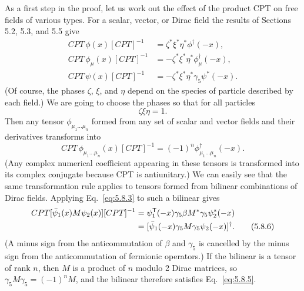 As a first step in the proof, let us work out the effect of the product CPT on
free fields of various types. For a scalar, vector, or Dirac field the results
of Sections 5.2, 5.3, and 5.5 give
\begin{align}
CPT\,\phi(x)[CPT]^{-1}&=\zeta^*\xi^*\eta^*\phi^\dagger(-x),
\tag{5.8.1}\label{eq:5.8.1}\\
CPT\,\phi_\mu(x)[CPT]^{-1}&=-\zeta^*\xi^*\eta^*\phi_\mu^\dagger(-x),
\tag{5.8.2}\label{eq:5.8.2}\\
CPT\,\psi(x)[CPT]^{-1}&=-\zeta^*\xi^*\eta^*\gamma_5\psi^*(-x).
\tag{5.8.3}\label{eq:5.8.3}
\end{align}
(Of course, the phases $\zeta$, $\xi$, and $\eta$ depend on the species of
particle described by each field.) We are going to choose the phases so that
for all particles
\begin{equation}
\zeta\xi\eta=1.
\tag{5.8.4}\label{eq:5.8.4}
\end{equation}
Then any tensor $\phi_{\mu_1\ldots\mu_n}$ formed from any set of scalar and
vector fields and their derivatives transforms into
\begin{equation}
CPT\,\phi_{\mu_1\ldots\mu_n}(x)[CPT]^{-1}
=(-1)^n\phi^\dagger_{\mu_1\ldots\mu_n}(-x).
\tag{5.8.5}\label{eq:5.8.5}
\end{equation}
(Any complex numerical coefficient appearing in these tensors is transformed
into its complex conjugate because CPT is antiunitary.) We can easily see that
the same transformation rule applies to tensors formed from bilinear
combinations of Dirac fields. Applying Eq.~\eqref{eq:5.8.3} to such a bilinear gives
\begin{align}
CPT[\bar\psi_1(x)M\psi_2(x)][CPT]^{-1}
&=\psi_1^{\mathsf T}(-x)\gamma_5\beta M^*\gamma_5\psi_2^*(-x)
\notag\\
&=[\bar\psi_1(-x)\gamma_5M\gamma_5\psi_2(-x)]^\dagger.
\tag{5.8.6}\label{eq:5.8.6}
\end{align}
(A minus sign from the anticommutation of $\beta$ and $\gamma_5$ is cancelled
by the minus sign from the anticommutation of fermionic operators.) If the
bilinear is a tensor of rank $n$, then $M$ is a product of $n$ modulo 2 Dirac
matrices, so $\gamma_5M\gamma_5=(-1)^nM$, and the bilinear therefore satisfies
Eq.~\eqref{eq:5.8.5}.

